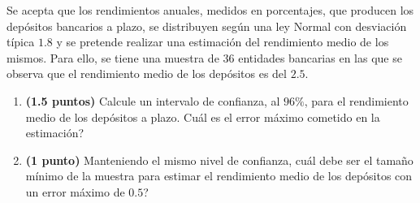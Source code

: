 
Se acepta que los rendimientos anuales, medidos en porcentajes, que producen los depósitos bancarios a plazo, se distribuyen según una ley Normal con desviación típica $1.8$ y se pretende realizar una estimación del rendimiento medio de los mismos. Para ello, se tiene una muestra de 36 entidades bancarias en las que se observa que el rendimiento medio de los depósitos es del $2.5$.
\begin{enumerate}[label=\alph*)]
\item \textbf{(1.5 puntos)} Calcule un intervalo de confianza, al $96\%$, para el rendimiento medio de los depósitos a plazo. \textquestiondown{}Cuál es el error máximo cometido en la estimación?
\item \textbf{(1 punto)} Manteniendo el mismo nivel de confianza, \textquestiondown{}cuál debe ser el tamaño mínimo de la muestra para estimar el rendimiento medio de los depósitos con un error máximo de $0.5$?
\end{enumerate}
